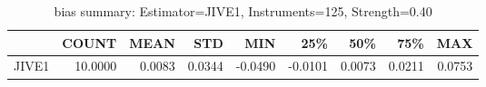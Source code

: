 \begin{table}[ht]
\centering
\caption{bias summary: Estimator=JIVE1, Instruments=125, Strength=0.40}
\begin{tabular}{lrrrrrrrr}
\toprule
 & COUNT & MEAN & STD & MIN & 25\% & 50\% & 75\% & MAX \\
\midrule
JIVE1 & 10.0000 & 0.0083 & 0.0344 & -0.0490 & -0.0101 & 0.0073 & 0.0211 & 0.0753 \\
\bottomrule
\end{tabular}
\end{table}
